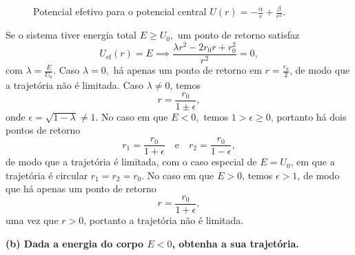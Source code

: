 \begin{figure}[H]
    \centering
    \caption{Potencial efetivo para o potencial central \(U(r) = -\frac{\alpha}{r} + \frac{\beta}{r^2}\).}
\end{figure}

Se o sistema tiver energia total \(E \geq U_0,\) um ponto de retorno satisfaz
\begin{equation}
    U_\mathrm{ef}(r) = E \implies \frac{\lambda r^2 - 2r_0 r + r_0^2}{r^2} = 0,
\end{equation}
com \(\lambda = \frac{E}{U_0}.\) Caso \(\lambda = 0,\) há apenas um ponto de retorno em \(r = \frac{r_0}{2}\), de modo que a trajetória não é limitada. Caso \(\lambda \neq 0\), temos
\begin{equation}
    r = \frac{r_0}{1 \pm \epsilon},
\end{equation}
onde \(\epsilon = \sqrt{1 - \lambda} \neq 1\). No caso em que \(E < 0,\) temos \(1 > \epsilon \geq 0\), portanto há dois pontos de retorno
\begin{equation}
    r_1 = \frac{r_0}{1+\epsilon}\quad\text{e}\quad r_2 = \frac{r_0}{1 - \epsilon},
\end{equation}
de modo que a trajetória é limitada, com o caso especial de \(E = U_0\), em que a trajetória é circular \(r_1 = r_2 = r_0\). No caso em que \(E > 0\), temos \(\epsilon > 1\), de modo que há apenas um ponto de retorno
\begin{equation}
    r = \frac{r_0}{1+\epsilon},
\end{equation}
uma vez que \(r > 0\), portanto a trajetória não é limitada.

\textbf{(b) Dada a energia do corpo \(E < 0\), obtenha a sua trajetória.}

